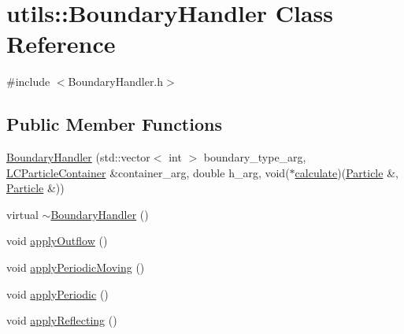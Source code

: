 \hypertarget{classutils_1_1BoundaryHandler}{\section{utils\-:\-:Boundary\-Handler Class Reference}
\label{classutils_1_1BoundaryHandler}
}


{\ttfamily \#include $<$Boundary\-Handler.\-h$>$}

\subsection*{Public Member Functions}
\begin{DoxyCompactItemize}
\item 
\hyperlink{classutils_1_1BoundaryHandler_aecff16bfef1e12ef1a251d7b44915493}{Boundary\-Handler} (std\-::vector$<$ int $>$ boundary\-\_\-type\-\_\-arg, \hyperlink{classutils_1_1LCParticleContainer}{L\-C\-Particle\-Container} \&container\-\_\-arg, double h\-\_\-arg, void($\ast$\hyperlink{classutils_1_1BoundaryHandler_ade349a546fc40f1eb2cc3753ac3536b9}{calculate})(\hyperlink{classParticle}{Particle} \&, \hyperlink{classParticle}{Particle} \&))
\item 
virtual \hyperlink{classutils_1_1BoundaryHandler_a8c795e94a9f951670a62d108f5ba02fa}{$\sim$\-Boundary\-Handler} ()
\item 
void \hyperlink{classutils_1_1BoundaryHandler_ae63925911b31b9877847c6e8d737cfc9}{apply\-Outflow} ()
\item 
void \hyperlink{classutils_1_1BoundaryHandler_afea9ba491aca8a3510fe20d3cab60649}{apply\-Periodic\-Moving} ()
\item 
void \hyperlink{classutils_1_1BoundaryHandler_a4ad00db701882fcec1fcb275c18f849f}{apply\-Periodic} ()
\item 
void \hyperlink{classutils_1_1BoundaryHandler_a7877146046a67f24d71a63e645ecdd6e}{apply\-Reflecting} ()
\end{DoxyCompactItemize}
